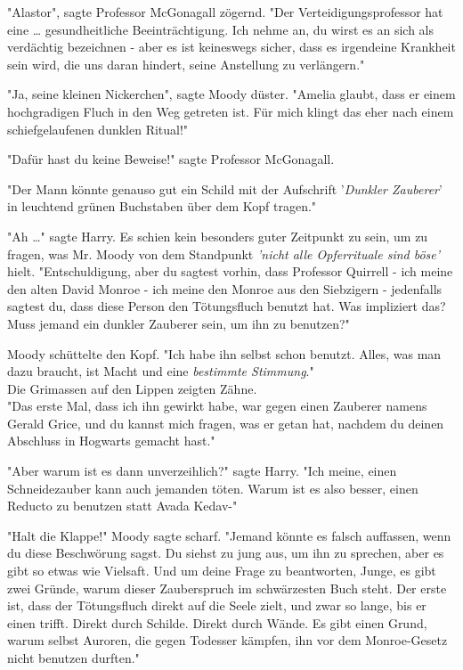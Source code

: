 {"Alastor", sagte Professor McGonagall zögernd. "Der Verteidigungsprofessor hat eine … gesundheitliche Beeinträchtigung. Ich nehme an, du wirst es an sich als verdächtig bezeichnen - aber es ist keineswegs sicher, dass es irgendeine Krankheit sein wird, die uns daran hindert, seine Anstellung zu verlängern."

"Ja, seine kleinen Nickerchen", sagte Moody düster. "Amelia glaubt, dass er einem hochgradigen Fluch in den Weg getreten ist. Für mich klingt das eher nach einem schiefgelaufenen dunklen Ritual!"

"Dafür hast du keine Beweise!" sagte Professor McGonagall.

"Der Mann könnte genauso gut ein Schild mit der Aufschrift '\emph{Dunkler Zauberer}' in leuchtend grünen Buchstaben über dem Kopf tragen."

"Ah …" sagte Harry. Es schien kein besonders guter Zeitpunkt zu sein, um zu fragen, was Mr. Moody von dem Standpunkt \emph{'nicht alle Opferrituale sind böse'} hielt. "Entschuldigung, aber du sagtest vorhin, dass Professor Quirrell - ich meine den alten David Monroe - ich meine den Monroe aus den Siebzigern - jedenfalls sagtest du, dass diese Person den Tötungsfluch benutzt hat. Was impliziert das? Muss jemand ein dunkler Zauberer sein, um ihn zu benutzen?"

Moody schüttelte den Kopf. "Ich habe ihn selbst schon benutzt. Alles, was man dazu braucht, ist Macht und eine \emph{bestimmte Stimmung}."\\ Die Grimassen auf den Lippen zeigten Zähne.\\ "Das erste Mal, dass ich ihn gewirkt habe, war gegen einen Zauberer namens Gerald Grice, und du kannst mich fragen, was er getan hat, nachdem du deinen Abschluss in Hogwarts gemacht hast."

"Aber warum ist es dann unverzeihlich?" sagte Harry. "Ich meine, einen Schneidezauber kann auch jemanden töten. Warum ist es also besser, einen Reducto zu benutzen statt Avada Kedav-"

"Halt die Klappe!" Moody sagte scharf. "Jemand könnte es falsch auffassen, wenn du diese Beschwörung sagst. Du siehst zu jung aus, um ihn zu sprechen, aber es gibt so etwas wie Vielsaft. Und um deine Frage zu beantworten, Junge, es gibt zwei Gründe, warum dieser Zauberspruch im schwärzesten Buch steht. Der erste ist, dass der Tötungsfluch direkt auf die Seele zielt, und zwar so lange, bis er einen trifft. Direkt durch Schilde. Direkt durch Wände. Es gibt einen Grund, warum selbst Auroren, die gegen Todesser kämpfen, ihn vor dem Monroe-Gesetz nicht benutzen durften."

}
